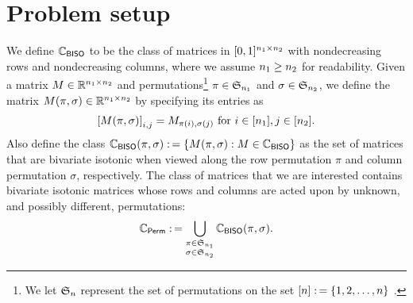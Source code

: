 \documentclass[final,12pt]{colt2018} %
\begin{document}

\section{Problem setup} \label{sec:setup}

We define $\mathbb{C}_{\mathsf{BISO}}$ to be the class of matrices
in $[0,1]^{n_1 \times n_2}$ with nondecreasing rows and
nondecreasing columns, where we assume $n_1 \geq n_2$ for readability. Given a matrix $M \in
\mathbb{R}^{n_1 \times n_2}$ and permutations\footnote{We let $\mathfrak{S}_n$ represent the set of permutations on the set $[n] :\,= \{1, 2, \ldots, n \}$ .} $\pi \in
\mathfrak{S}_{n_1}$ and $\sigma \in \mathfrak{S}_{n_2}$, we define the
matrix $M(\pi,\sigma) \in \mathbb{R}^{n_1 \times n_2}$ by
specifying its entries as
\begin{align*}
\left[ M(\pi,\sigma)\right]_{i, j} = M_{\pi(i), \sigma(j)} \text{ for
} i \in [n_1], j \in [n_2].
\end{align*}
Also define the class $ \mathbb{C}_{\mathsf{BISO}}(\pi, \sigma) :\,= \{M(\pi, \sigma): M
\in \mathbb{C}_{\mathsf{BISO}}\} $ as the set of matrices that are bivariate isotonic when
viewed along the row permutation $\pi$ and column permutation
$\sigma$, respectively.
The class of matrices that we are interested contains bivariate isotonic matrices whose rows and columns are acted upon by unknown, and possibly different, permutations:
\begin{align*}
\mathbb{C}_{\mathsf{Perm}} :\,= \bigcup_{\substack{\pi \in \mathfrak{S}_{n_1} \\ \sigma \in
    \mathfrak{S}_{n_2}}} \mathbb{C}_{\mathsf{BISO}}(\pi, \sigma) .
\end{align*}
\end{document}
